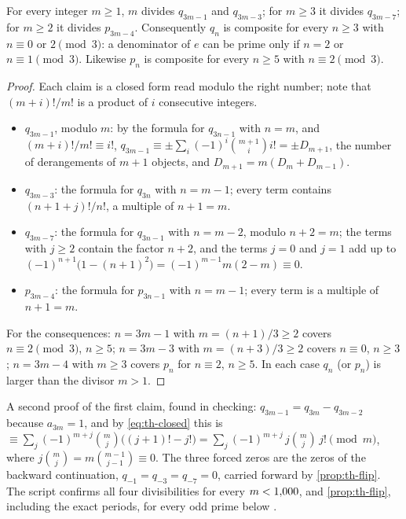 \begin{theorem}\label{thm:th-div}
For every integer $m \ge 1$, $m$ divides $q_{3m-1}$ and $q_{3m-3}$; for $m \ge 3$ it divides $q_{3m-7}$; for $m \ge 2$ it divides $p_{3m-4}$. Consequently $q_n$ is composite for every $n \ge 3$ with $n \equiv 0$ or $2 \pmod 3$: a denominator of $e$ can be prime only if $n = 2$ or $n \equiv 1 \pmod 3$. Likewise $p_n$ is composite for every $n \ge 5$ with $n \equiv 2 \pmod 3$.
\end{theorem}

\begin{proof}
Each claim is a closed form read modulo the right number; note that $(m+i)!/m!$ is a product of $i$ consecutive integers.
\begin{itemize}
\item $q_{3m-1}$, modulo $m$: by the formula for $q_{3n-1}$ with $n = m$, and $(m+i)!/m! \equiv i!$, $q_{3m-1} \equiv \pm\sum_i(-1)^i\binom{m+1}{i}i! = \pm D_{m+1}$, the number of derangements of $m + 1$ objects, and $D_{m+1} = m(D_m + D_{m-1})$.
\item $q_{3m-3}$: the formula for $q_{3n}$ with $n = m - 1$; every term contains $(n+1+j)!/n!$, a multiple of $n + 1 = m$.
\item $q_{3m-7}$: the formula for $q_{3n-1}$ with $n = m - 2$, modulo $n + 2 = m$; the terms with $j \ge 2$ contain the factor $n + 2$, and the terms $j = 0$ and $j = 1$ add up to $(-1)^{n+1}\bigl(1 - (n+1)^2\bigr) = (-1)^{m-1}m(2 - m) \equiv 0$.
\item $p_{3m-4}$: the formula for $p_{3n-1}$ with $n = m - 1$; every term is a multiple of $n + 1 = m$.
\end{itemize}
For the consequences: $n = 3m - 1$ with $m = (n+1)/3 \ge 2$ covers $n \equiv 2 \pmod 3$, $n \ge 5$; $n = 3m - 3$ with $m = (n+3)/3 \ge 2$ covers $n \equiv 0$, $n \ge 3$; $n = 3m - 4$ with $m \ge 3$ covers $p_n$ for $n \equiv 2$, $n \ge 5$. In each case $q_n$ (or $p_n$) is larger than the divisor $m > 1$.
\end{proof}

A second proof of the first claim, found in checking: $q_{3m-1} = q_{3m} - q_{3m-2}$ because $a_{3m} = 1$, and by \eqref{eq:th-closed} this is $\equiv \sum_j(-1)^{m+j}\binom{m}{j}\bigl((j+1)! - j!\bigr) = \sum_j(-1)^{m+j}\,j\binom{m}{j}\,j! \pmod m$, where $j\binom{m}{j} = m\binom{m-1}{j-1} \equiv 0$. The three forced zeros are the zeros of the backward continuation, $q_{-1} = q_{-3} = q_{-7} = 0$, carried forward by \cref{prop:th-flip}. The script confirms all four divisibilities for every $m < 1{,}000$, and \cref{prop:th-flip}, including the exact periods, for every odd prime below \ThElim.

